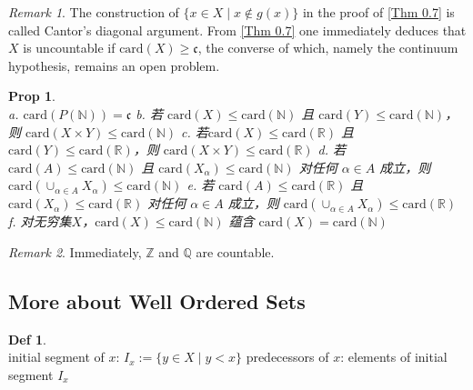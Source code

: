 \documentclass[hidelinks]{article}
\theoremstyle{definition}
\newtheorem*{defin}{Def}
\theoremstyle{plain}
\newtheorem{proposition}[theorem]{Prop}
\theoremstyle{remark}
\newtheorem*{remark}{Remark}
\begin{document}
\begin{remark}
The construction of $\{x\in X\mid x\not\in g(x)\}$ in the proof of \autoref{Thm 0.7} is called Cantor's diagonal argument. From \autoref{Thm 0.7} one immediately deduces that $X$ is uncountable if $\mathrm{card}(X)\geq \mathfrak{c}$, the converse of which, namely the continuum hypothesis, remains an open problem.
\end{remark} 

\begin{proposition}~\\
a. $\mathrm{card}(P(\mathbb{N}))=\mathfrak{c}$ \newline
b. 若 $\mathrm{card}(X)\leq \mathrm{card}(\mathbb{N})$ 且 $\mathrm{card}(Y)\leq \mathrm{card}(\mathbb{N})$，则 $\mathrm{card}(X\times Y)\leq \mathrm{card}(\mathbb{N})$ \newline
c. 若$\mathrm{card}(X)\leq \mathrm{card}(\mathbb{R})$ 且 $\mathrm{card}(Y)\leq \mathrm{card}(\mathbb{R})$，则 $\mathrm{card}(X\times Y)\leq \mathrm{card}(\mathbb{R})$ \newline
d. 若 $\mathrm{card}(A)\leq \mathrm{card}(\mathbb{N})$ 且 $\mathrm{card}(X_\alpha)\leq \mathrm{card}(\mathbb{N})$ 对任何 $\alpha \in A$ 成立，则 $\mathrm{card}(\cup_{\alpha \in A}X_\alpha)\leq \mathrm{card}(\mathbb{N})$ \newline
e. 若 $\mathrm{card}(A)\leq \mathrm{card}(\mathbb{R})$ 且 $\mathrm{card}(X_\alpha)\leq \mathrm{card}(\mathbb{R})$ 对任何 $\alpha \in A$ 成立，则 $\mathrm{card}(\cup_{\alpha \in A}X_\alpha)\leq \mathrm{card}(\mathbb{R})$ \newline
f. 对无穷集$X$，$\mathrm{card}(X)\leq \mathrm{card}(\mathbb{N})$ 蕴含 $\mathrm{card}(X)=\mathrm{card}(\mathbb{N})$
\end{proposition}

\begin{remark}
Immediately, $\mathbb{Z}$ and $\mathbb{Q}$ are countable.
\end{remark}

\subsection{More about Well Ordered Sets}
\begin{defin}~\\
initial segment of $x$: $I_x:=\{y\in X\mid y<x\}$ \newline
predecessors of $x$: elements of initial segment $I_x$
\end{defin}
\end{document}
